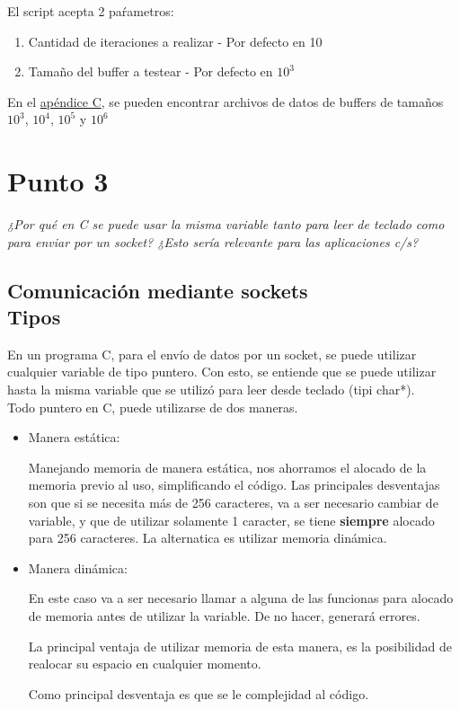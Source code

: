 \documentclass[12pt,journal,compsoc]{IEEEtran}
\begin{document}
El script acepta 2 paŕametros:
\begin{enumerate}
  \item Cantidad de iteraciones a realizar - Por defecto en 10
  \item Tamaño del buffer a testear - Por defecto en $10^{3}$
\end{enumerate}

En el \hyperref[appendixC]{apéndice C}, se pueden encontrar archivos de datos de buffers de tamaños
$10^{3}$, $10^{4}$, $10^{5}$ y $10^{6}$

\section{Punto 3}
\textit{¿Por qué en C se puede usar la misma variable tanto para leer de teclado como para
enviar por un socket? ¿Esto sería relevante para las aplicaciones c/s?}
\subsection{Comunicación mediante sockets\\Tipos}
En un programa C, para el envío de datos por un socket, se puede utilizar cualquier variable de tipo puntero.
Con esto, se entiende que se puede utilizar hasta la misma variable que se utilizó para leer desde teclado
(tipi char*).\\
Todo puntero en C, puede utilizarse de dos maneras.

\begin{itemize}
  \item Manera estática:
  
  Manejando memoria de manera estática, nos ahorramos el alocado de la memoria
  previo al uso, simplificando el código.
  Las principales desventajas son que si se necesita más de 256 caracteres, va a ser necesario
  cambiar de variable, y que de utilizar solamente 1 caracter, se tiene \textbf{siempre} alocado
  para 256 caracteres.
  La alternatica es utilizar memoria dinámica.\\

  \item Manera dinámica:
  

  En este caso va a ser necesario llamar a alguna de las funcionas para alocado de memoria antes
  de utilizar la variable. De no hacer, generará errores.
  
  La principal ventaja de utilizar memoria de esta manera, es la posibilidad de realocar su espacio
  en cualquier momento.
  
  Como principal desventaja es que se le complejidad al código.
\end{itemize}
\end{document}
